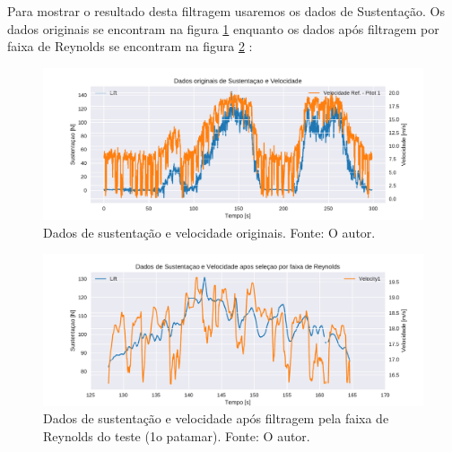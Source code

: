 Para mostrar o resultado desta filtragem usaremos os dados de Sustentação. Os dados originais se encontram na figura \ref{fig:orig_lift_plot} enquanto os dados após filtragem por faixa de Reynolds se encontram na figura \ref{fig:lift_reynolds_filter} :

\begin{figure}[!ht]
    \centering
    \includegraphics[width=.8\linewidth]{plots/orig_lift_plot.pdf}
    \caption{Dados de sustentação e velocidade originais. Fonte: O autor.}
    \label{fig:orig_lift_plot}
\end{figure}


\begin{figure}[!ht]
    \centering
    \includegraphics[width=.8\linewidth]{plots/reynolds_lift_plot.pdf}
    \caption{Dados de sustentação e velocidade após filtragem pela faixa de Reynolds do teste (1o patamar). Fonte: O autor.}
    \label{fig:lift_reynolds_filter}
\end{figure}




